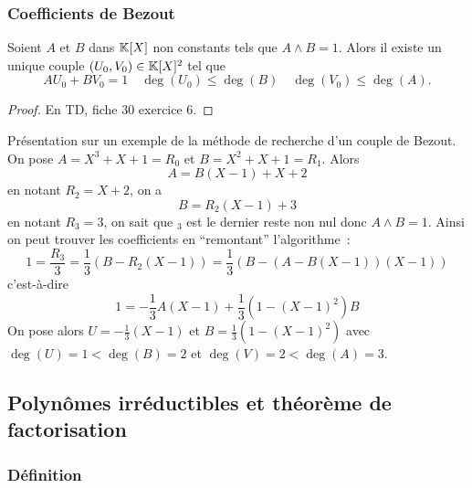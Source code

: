 \subsubsection{Coefficients de Bezout}

\begin{prop}
  Soient \(A\) et \(B\) dans \(\mathbb{K}[X]\) non constants tels que \(A\wedge B=1\). Alors il existe un unique couple \((U_0,V_0) \in \mathbb{K}[X]^2\) tel que
  \begin{equation}
    AU_0+BV_0 = 1 \quad \deg(U_0) \leqslant \deg(B) \quad \deg(V_0) \leqslant \deg(A).
  \end{equation}
\end{prop}
\begin{proof}
  En TD, fiche 30 exercice 6.
\end{proof}

Présentation sur un exemple de la méthode de recherche d'un couple de Bezout. On pose \(A=X^3+X+1=R_0\) et \(B=X^2+X+1=R_1\). Alors
\begin{equation}
  A=B(X-1)+X+2
\end{equation}
en notant \(R_2=X+2\), on a
\begin{equation}
  B=R_2(X-1)+3
\end{equation}
en notant \(R_3=3\), on sait que \(_3\) est le dernier reste non nul donc \(A\wedge B=1\). Ainsi on peut trouver les coefficients en ``remontant'' l'algorithme~:
\begin{equation}
  1 = \frac{R_3}{3} = \frac{1}{3}(B-R_2(X-1)) = \frac{1}{3}(B-(A-B(X-1))(X-1))
\end{equation}
c'est-à-dire
\begin{equation}
  1 = -\frac{1}{3} A(X-1) + \frac{1}{3}(1-(X-1)^2)B
\end{equation}
On pose alors \(U=-\frac{1}{3}(X-1)\) et \(B=\frac{1}{3}(1-(X-1)^2)\) avec \(\deg(U)=1 < \deg(B)=2\) et \(\deg(V)=2 < \deg(A)=3\).

\subsection{Polynômes irréductibles et théorème de factorisation}

\subsubsection{Définition}

